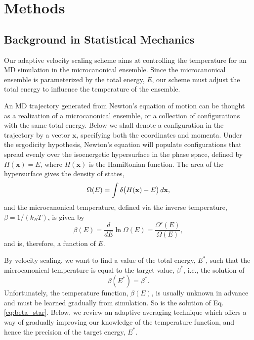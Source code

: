 \documentclass[reprint]{revtex4-1}
\begin{document}
\section{Methods}



\subsection{Background in Statistical Mechanics}



Our adaptive velocity scaling scheme aims at
controlling the temperature for an
MD simulation in the microcanonical ensemble.
%
Since the microcanonical ensemble is parameterized by
the total energy, $E$,
our scheme must adjust the total energy
to influence the temperature of the ensemble.


An MD trajectory generated from
Newton's equation of motion
can be thought as a realization
of a microcanonical ensemble,
or a collection of configurations
with the same total energy.
%
Below we shall denote a configuration in the trajectory
by a vector $\mathbf x$,
specifying both the coordinates and momenta.
%
Under the ergodicity hypothesis,
Newton's equation will populate configurations
that spread evenly over
the isoenergetic hypersurface in the phase space,
defined by
$H(\mathbf x) = E$,
where $H(\mathbf x)$ is the Hamiltonian function.
%
The area of the hypersurface gives the density of states,
%
\begin{equation}
  \Omega(E)
  =
  \int
    \delta\bigl( H(\mathbf x) - E \bigr)
    \, d\mathbf x
  ,
  \notag
\end{equation}
%
and the microcanonical temperature,
defined via the inverse temperature,
$\beta = 1/(k_B T)$,
is given by
%
\begin{equation}
  \beta(E)
  =
  \frac{ d }{ dE }
  \ln \Omega(E)
  =
  \frac{ \Omega'(E) }
       { \Omega(E)  }
  ,
  \label{eq:betaE_def}
\end{equation}
%
and is, therefore, a function of $E$.
%

By velocity scaling, we want to
find a value of the total energy, $E^*$,
such that the microcanonical temperature
is equal to the target value, $\beta^*$,
i.e., the solution of
%
\begin{equation}
  \beta(E^*)
  =
  \beta^*
  .
  \label{eq:beta_star}
\end{equation}
%
Unfortunately, the temperature function, $\beta(E)$,
is usually unknown in advance
and must be learned gradually from simulation.
%
So is the solution of Eq. \eqref{eq:beta_star}.
%
Below, we review an adaptive averaging technique
which offers a way of gradually improving
our knowledge of the temperature function,
and hence the precision of the target energy, $E^*$.
\end{document}
